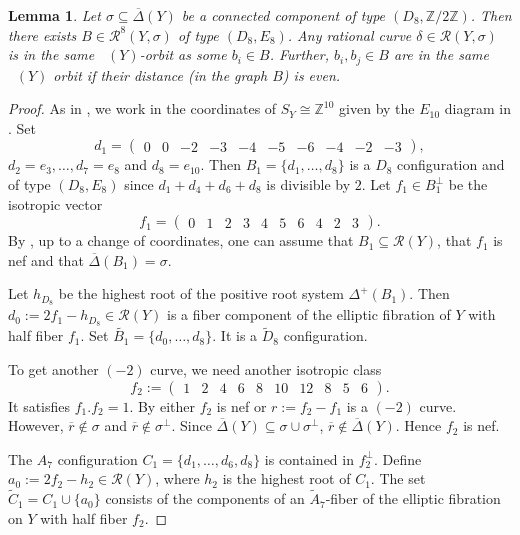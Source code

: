\documentclass[a4paper]{amsart}
\theoremstyle{definition}
\theoremstyle{plain}
\newtheorem{lemma}[definition]{Lemma}
\DeclareMathOperator{\aut}{Aut^*}
\newcommand{\ZZ}{\mathbb{Z}}
\newcommand{\R}{\mathcal{R}}
\newcommand{\DeltabarY}{\overline{\Delta}(Y)}
\begin{document}
\begin{lemma}\label{lem:AutOrbitD8E8}
Let $\sigma \subseteq \DeltabarY$ be a connected component of type $(D_8, \ZZ/2\ZZ)$.
Then there exists $B \in \R^8(Y,\sigma)$ of type $(D_8,E_8)$. Any rational curve $\delta \in \R(Y,\sigma)$ is in the same $\aut(Y)$-orbit as some $b_i \in B$. Further, $b_i, b_j \in B$ are in the same $\aut(Y)$ orbit if their distance (in the graph $B$) is even.
\end{lemma}
\begin{proof}
As in , we work in the coordinates of $S_Y \cong \ZZ^{10}$ given by the $E_{10}$ diagram in .
Set
\[d_1 = \begin{pmatrix}
0& 0& -2& -3& -4& -5& -6& -4& -2& -3
\end{pmatrix},\]
$d_2 = e_3,\dots, d_7=e_8$ and $d_8=e_{10}$.
Then $B_1 = \{d_1,\dots, d_8\}$ is a $D_8$ configuration and of type $(D_8,E_8)$ since $d_1+d_4+d_6+d_8 $ is divisible by $2$. 
Let $f_1 \in B_1^\perp$ be the isotropic vector
\[f_1=\begin{pmatrix}
   0&  1&  2&  3&  4&  5&  6&  4&  2&  3
  \end{pmatrix}.
\]
By , up to a change of coordinates, one can assume that $B_1 \subseteq \R(Y)$, that $f_1$ is nef and that $\overline{\Delta}(B_1)=\sigma$.

Let $h_{D_8}$ be the highest root of the positive root system $\Delta^+(B_1)$. Then
$d_0 := 2f_1 - h_{D_8} \in \R(Y)$ is a fiber component of the elliptic fibration of $Y$ with half fiber $f_1$. Set $\widetilde{B_1} = \{d_0,\dots, d_8\}$. It is a $\widetilde{D}_8$ configuration.

To get another $(-2)$ curve, we need another isotropic class
\[
f_2 :=
\begin{pmatrix}
1&  2&  4&  6&  8&  10&  12&  8&  5&  6
\end{pmatrix}.
\]
It satisfies $f_1.f_2=1$. By  either $f_2$ is nef or $r:=f_2-f_1$ is a $(-2)$ curve. However, $\overline{r} \not \in \sigma$ 
and $\overline{r} \not \in \sigma^\perp$. Since $\DeltabarY \subseteq \sigma \cup \sigma^\perp$, $\overline{r} \not\in\DeltabarY$. Hence $f_2$ is nef. 

The $A_7$ configuration $C_1=\{d_1,\dots, d_6,d_8\}$ is contained in $ f_2^\perp$. Define $a_0 := 2f_2 - h_2 \in \R(Y)$, where $h_2$ is the highest root of $C_1$. The set $\widetilde{C}_1=C_1 \cup \{a_0\}$ consists of the components of an $\widetilde{A}_7$-fiber of the elliptic fibration on $Y$ with half fiber $f_2$.


\end{proof}
\end{document}
